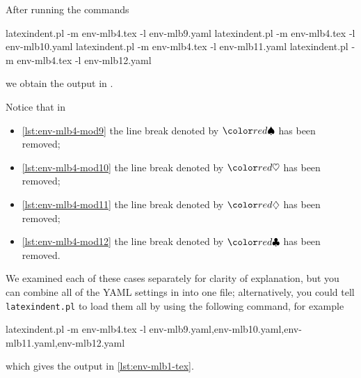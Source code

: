 	After running the commands
	\begin{commandshell}
latexindent.pl -m env-mlb4.tex -l env-mlb9.yaml
latexindent.pl -m env-mlb4.tex -l env-mlb10.yaml
latexindent.pl -m env-mlb4.tex -l env-mlb11.yaml
latexindent.pl -m env-mlb4.tex -l env-mlb12.yaml
\end{commandshell}

	we obtain the output in .

	\begin{minipage}{.45\linewidth}
	\end{minipage}
	\hfill
	\begin{minipage}{.45\linewidth}
	\end{minipage}

	\begin{minipage}{.45\linewidth}
	\end{minipage}
	\hfill
	\begin{minipage}{.45\linewidth}
	\end{minipage}

	Notice that in
	\begin{itemize}
		\item \cref{lst:env-mlb4-mod9} the line break denoted by $\BeginStartsOnOwnLine$ has been removed;
		\item \cref{lst:env-mlb4-mod10} the line break denoted by $\BodyStartsOnOwnLine$ has been removed;
		\item \cref{lst:env-mlb4-mod11} the line break denoted by $\EndStartsOnOwnLine$ has been removed;
		\item \cref{lst:env-mlb4-mod12} the line break denoted by $\EndFinishesWithLineBreak$ has been removed.
	\end{itemize}
	We examined each of these cases separately for clarity of explanation, but you can combine all of the YAML
	settings in  into one file; alternatively, you could tell \texttt{latexindent.pl}
	to load them all by using the following command, for example
	\begin{sidebyside}
		\begin{commandshell}
latexindent.pl -m env-mlb4.tex -l env-mlb9.yaml,env-mlb10.yaml,env-mlb11.yaml,env-mlb12.yaml
\end{commandshell}
	\end{sidebyside}
	which gives the output in \vref{lst:env-mlb1-tex}.

